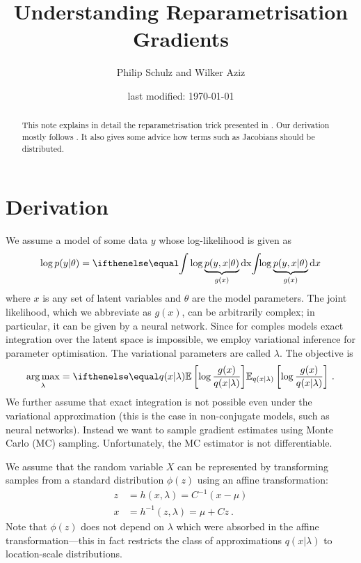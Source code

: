 \documentclass[a4paper,11pt]{article}
\author{Philip Schulz and Wilker Aziz}
\title{Understanding Reparametrisation Gradients}
\date{last modified: \today}
\begin{document}
\maketitle

\begin{abstract}
This note explains in detail the reparametrisation trick presented in \cite{KingmaWelling:2013,RezendeEtAl:2014,TitsiasLazarogredilla:2014}. Our derivation mostly follows \cite{TitsiasLazarogredilla:2014}. It also gives some advice how terms such as Jacobians should be distributed.
\end{abstract}

\section{Derivation}

We assume a model of some data $ y $ whose log-likelihood is given as
\begin{equation}
\log p(y|\theta) = \intl { \log \underbrace{p(y,x|\theta)}_{g(x)} } {x} 
\end{equation}
where $ x $ is any set of latent variables and $ \theta $ are the model parameters. The joint likelihood, which we abbreviate as $ g(x) $, can be arbitrarily
complex; in particular, it can be given by a neural network. Since for comples models exact integration over the latent space is impossible, we employ variational
inference for parameter optimisation. The variational parameters are called $ \lambda $. The objective is
\begin{equation} \label{eq:objective}
\underset{\lambda}{\arg \max} = \E[q(x|\lambda)]{\log \dfrac{g(x)}{q(x|\lambda)}} \ .
\end{equation}
We further assume that exact integration is not possible even under the variational approximation (this is the case in non-conjugate models, such as neural networks). Instead we want to sample gradient estimates using Monte Carlo (MC) sampling. Unfortunately, the MC estimator is not differentiable.

We assume that the random variable $X$ can be represented by transforming samples from a standard distribution $\phi(z)$ using an affine transformation:
\begin{subequations}\label{eq:h}
\begin{align}
z &= h(x, \lambda) = C^{-1} (x - \mu)  \\
x &= h^{-1}(z, \lambda) = \mu + Cz ~ .
\end{align}
\end{subequations}
Note that $\phi(z)$ does not depend on $\lambda$ which were absorbed in the affine transformation---this in fact restricts the class of approximations $q(x|\lambda)$ to location-scale distributions.
\end{document}

